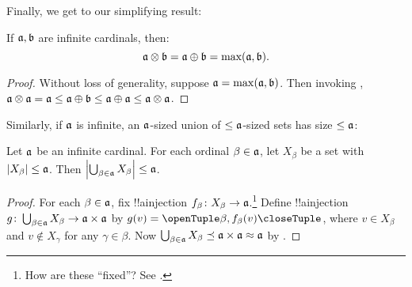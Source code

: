 \documentclass[../../../include/open-logic-section]{subfiles}
\begin{document}
Finally, we get to our simplifying result:

\begin{thm}
If $\mathfrak{a}, \mathfrak{b}$ are infinite cardinals, then:
\[
	\mathfrak{a}
\otimes \mathfrak{b} = \mathfrak{a} \oplus \mathfrak{b} =
\text{max}(\mathfrak{a}, \mathfrak{b}).
\]
\end{thm}

\begin{proof}
Without loss of generality, suppose $\mathfrak{a} = \max(\mathfrak{a},
\mathfrak{b})$. Then invoking ,
$\mathfrak{a}\otimes\mathfrak{a} = \mathfrak{a} \leq \mathfrak{a}
\oplus \mathfrak{b} \leq \mathfrak{a} \oplus \mathfrak{a} \leq
\mathfrak{a} \otimes \mathfrak{a}$. \end{proof}\noindent Similarly,
if $\mathfrak{a}$ is infinite, an $\mathfrak{a}$-sized union of
$\leq\mathfrak{a}$-sized sets has size $\leq\mathfrak{a}$:

\begin{prop}
Let $\mathfrak{a}$ be an infinite cardinal. For each ordinal $\beta
\in \mathfrak{a}$, let $X_\beta$ be a set with $\left| X_\beta \right| \leq
\mathfrak{a}$. Then $\left| \bigcup_{\beta \in \mathfrak{a}} X_\beta \right|
\leq \mathfrak{a}$.
\end{prop}

\begin{proof}
For each $\beta \in \mathfrak{a}$, fix !!a{injection} $f_\beta \colon
X_\beta \to \mathfrak{a}$.\footnote{How are these ``fixed''? See .} Define !!a{injection} $g \colon
\bigcup_{\beta \in \mathfrak{a}} X_\beta \to \mathfrak{a} \times
\mathfrak{a}$ by $g(v) = \tuple{\beta, f_\beta(v)}$, where $v \in
X_\beta$ and $v \notin X_\gamma$ for any $\gamma \in \beta$. Now
$\bigcup_{\beta \in \mathfrak{a}} X_\beta \preceq \mathfrak{a} \times
\mathfrak{a} \approx \mathfrak{a}$ by .
\end{proof}
\end{document}
